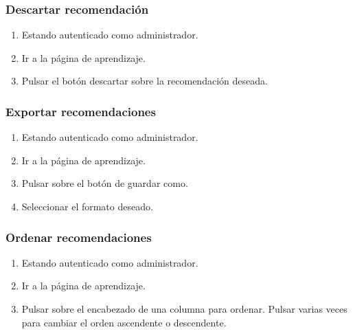 \subsubsection{Descartar recomendación}

\begin{enumerate}
\item Estando autenticado como administrador.
\item Ir a la página de aprendizaje.
\item Pulsar el botón descartar sobre la recomendación deseada.
\end{enumerate}

\subsubsection{Exportar recomendaciones}

\begin{enumerate}
\item Estando autenticado como administrador.
\item Ir a la página de aprendizaje.
\item Pulsar sobre el botón de guardar como.
\item Seleccionar el formato deseado.
\end{enumerate}

\subsubsection{Ordenar recomendaciones}

\begin{enumerate}
\item Estando autenticado como administrador.
\item Ir a la página de aprendizaje.
\item Pulsar sobre el encabezado de una columna para ordenar. Pulsar varias veces para cambiar el orden ascendente o descendente.
\end{enumerate}

